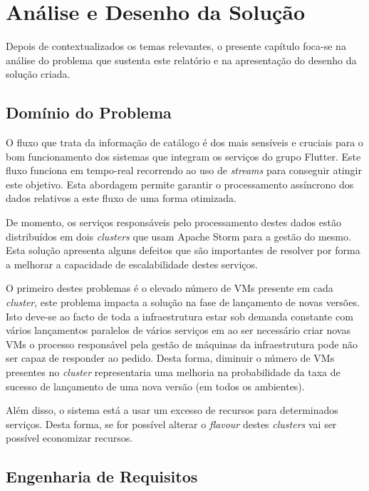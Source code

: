 \chapter{Análise e Desenho da Solução}
\label{sec:3-Analise}

Depois de contextualizados os temas relevantes, o presente capítulo foca-se na análise do problema 
que sustenta este relatório e na apresentação do desenho da solução criada.

\section{Domínio do Problema}

O fluxo que trata da informação de catálogo é dos mais sensíveis e cruciais para o bom funcionamento
dos sistemas que integram os serviços do grupo Flutter. Este fluxo funciona em tempo-real recorrendo
ao uso de \textit{streams} para conseguir atingir este objetivo. Esta abordagem permite garantir
o processamento assíncrono dos dados relativos a este fluxo de uma forma otimizada.

De momento, os serviços responsáveis pelo processamento destes dados estão distribuídos em dois
\textit{clusters} que usam Apache Storm para a gestão do mesmo. Esta solução apresenta alguns
defeitos que são importantes de resolver por forma a melhorar a capacidade de escalabilidade destes
serviços. 

O primeiro destes problemas é o elevado número de \acp{VM} presente em cada \textit{cluster},
este problema impacta a solução na fase de lançamento de novas versões. Isto deve-se ao facto de
toda a infraestrutura estar sob demanda constante com vários lançamentos paralelos de vários serviços
em ao ser necessário criar novas \acp{VM} o processo responsável pela gestão de máquinas da
infraestrutura pode não ser capaz de responder ao pedido. Desta forma, diminuir o número de \acp{VM}
presentes no \textit{cluster} representaria uma melhoria na probabilidade da taxa de sucesso de
lançamento de uma nova versão (em todos os ambientes).

Além disso, o sistema está a usar um excesso de recursos para determinados serviços. Desta forma,
se for possível alterar o \textit{\gls{flavour}} destes \textit{clusters} vai ser possível economizar
recursos.

\section{Engenharia de Requisitos}

